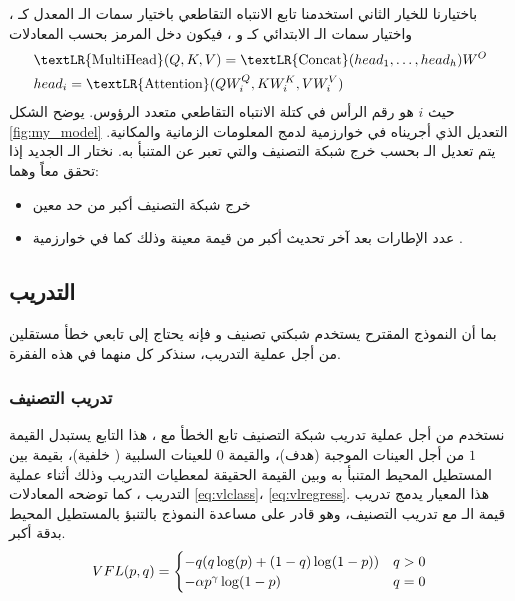 باختيارنا للخيار الثاني استخدمنا تابع الانتباه التقاطعي باختيار سمات الـ
المعدل كـ
،
واختيار سمات الـ 
الابتدائي كـ
و
، 
فيكون دخل المرمز بحسب المعادلات 
\textLR{\ref{eq:MHA}}
\begin{equation}
\begin{split}
&\text{\textLR{MultiHead}}(Q, K, V) = \text{\textLR{Concat}}(head_1,\dots,head_h)W^O\\
&head_i = \text{\textLR{Attention}}(QW_i^Q, KW_i^K, VW_i^V)\\
\end{split}
\label{eq:MHA}
\end{equation}
\newline
حيث 
$i$
هو رقم الرأس في كتلة الانتباه التقاطعي متعدد الرؤوس.
يوضح الشكل 
\ref{fig:my_model}
 التعديل الذي أجريناه في خوارزمية
لدمج المعلومات الزمانية والمكانية.
يتم تعديل الـ
بحسب خرج شبكة التصنيف والتي تعبر عن
المتنبأ به.
 نختار الـ
 الجديد إذا تحقق
 معاً وهما:
 \begin{itemize}
 	\item
 	خرج شبكة التصنيف 
 	أكبر من حد معين
 	\item
 	عدد الإطارات بعد آخر تحديث
 	 أكبر من قيمة معينة 
 	وذلك كما في خوارزمية 
 	.
 \end{itemize}

\subsection{التدريب}
بما أن النموذج المقترح يستخدم شبكتي تصنيف و
فإنه يحتاج إلى تابعي خطأ مستقلين من أجل عملية التدريب، سنذكر كل منهما في هذه الفقرة.
\subsubsection{تدريب التصنيف}
نستخدم من أجل عملية تدريب شبكة التصنيف تابع الخطأ 
مع 
،
هذا التابع يستبدل القيمة
$1$ 
من أجل العينات الموجبة (هدف)، والقيمة 
$0$
للعينات السلبية ( خلفية)، بقيمة
بين المستطيل المحيط المتنبأ به وبين القيمة الحقيقة
لمعطيات التدريب
وذلك أثناء عملية التدريب
،
كما توضحه المعادلات 
\ref{eq:vlclass}،
\ref{eq:vlregress}.
\newline
هذا المعيار يدمج تدريب قيمة الـ
مع تدريب التصنيف، وهو قادر على مساعدة النموذج بالتنبؤ بالمستطيل المحيط بدقة أكبر.
\begin{equation}
VFL(p,q) = \begin{cases}
-q(q\log(p) + (1-q)\log(1-p)) &  q > 0 \\
-\alpha p^\gamma \log(1-p) &  q=0 \\
\end{cases}\\
\label{eq:vlclass}
\end{equation}

